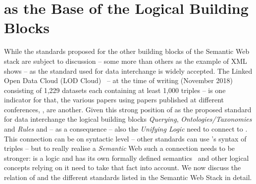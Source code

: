 \section{\rdf as the Base of the Logical Building Blocks}
While the standards proposed for the other building blocks of the Semantic Web stack are subject to discussion -- some more than others as the example of XML shows -- 
\rdf as 
the standard 
used for data interchange is widely accepted. The Linked Open Data Cloud (LOD Cloud)~\cite{LODCloud} -- at the time of writing (November 2018) 
consisting of 1,229 datasets each containing at least 1,000 \rdf triples -- is one indicator for that, the various papers using \rdf papers 
published at different conferences, \eg \cite{iswc,eswc},
are another. 
Given this strong position of \rdf as the proposed standard for data interchange 
the logical building blocks \emph{Querying}, \emph{Ontologies/Taxonomies} and \emph{Rules} and -- as a consequence -- also the
\emph{Unifying Logic} need to connect to \rdf. 
This connection can be on syntactic level -- other standards can use \rdf's syntax of triples -- but to really realise a \emph{Semantic} Web 
such a connection needs to be stronger:
\rdf is a logic and has its own formally defined semantics~\cite{RDFSemantics} and other logical concepts relying on it need to take that fact into account. 
We now discuss the relation of \rdf and the different standards listed in the Semantic Web Stack in detail.


